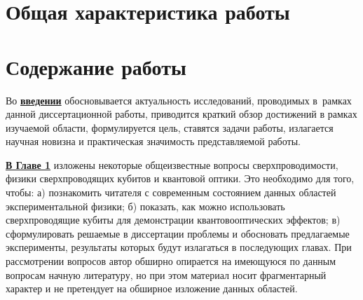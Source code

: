 
\section*{Общая характеристика работы}

\newcommand{\actuality}{\underline{\textbf{\actualityTXT}}}
\newcommand{\progress}{\underline{\textbf{\progressTXT}}}
\newcommand{\aim}{\underline{{\textbf\aimTXT}}}
\newcommand{\tasks}{\underline{\textbf{\tasksTXT}}}
\newcommand{\novelty}{\underline{\textbf{\noveltyTXT}}}
\newcommand{\influence}{\underline{\textbf{\influenceTXT}}}
\newcommand{\methods}{\underline{\textbf{\methodsTXT}}}
\newcommand{\defpositions}{\underline{\textbf{\defpositionsTXT}}}
\newcommand{\reliability}{\underline{\textbf{\reliabilityTXT}}}
\newcommand{\probation}{\underline{\textbf{\probationTXT}}}
\newcommand{\contribution}{\underline{\textbf{\contributionTXT}}}
\newcommand{\publications}{\underline{\textbf{\publicationsTXT}}}




\section*{Содержание работы}
Во \underline{\textbf{введении}} обосновывается актуальность
исследований, проводимых в~рамках данной диссертационной работы,
приводится краткий обзор достижений в рамках изучаемой области,
формулируется цель, ставятся задачи работы, излагается научная новизна
и практическая значимость представляемой работы.
\newcommand{\vp}{\varphi}

\underline{\textbf{В Главе 1}} изложены некоторые общеизвестные вопросы сверхпроводимости, физики сверхпроводящих кубитов и квантовой оптики. Это необходимо для того, чтобы: а) познакомить читателя с современным состоянием данных областей экспериментальной физики; б) показать, как можно использовать сверхпроводящие кубиты для демонстрации квантовооптических эффектов; в) сформулировать решаемые в диссертации проблемы и обосновать предлагаемые эксперименты, результаты которых будут излагаться в последующих главах. При рассмотрении вопросов автор обширно опирается на имеющуюся по данным вопросам начную литературу, но при этом материал носит фрагментарный характер и не претендует на обширное изложение данных областей. 

